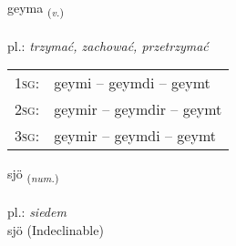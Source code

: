 \documentclass[frontgrid, backgrid]{flacards}\usepackage[]{graphicx}\usepackage[]{xcolor}
\begin{document}
\renewcommand{\flhead}{\vskip5pt \fboxsep=0pt {\small\bfseries\footnotesize Sagnorð | czasownik}}
\renewcommand{\fcfoot}{\vskip5pt \fboxsep=0pt \hspace{2pt}{\small\bfseries\footnotesize 1K}}

\renewcommand{\blhead}{\vskip5pt {\small\bfseries\footnotesize Sagnorð | czasownik }}
\renewcommand{\bcfoot}{\vskip5pt \hspace{2pt}{\small\bfseries\footnotesize 1K}}


{geyma \small{\textsubscript{(\textit{v.})}} \\[1ex] %
\textphonetic{[ceiːma]} \\
pl.: \emph{trzymać, zachować, przetrzymać} \\  [2ex]
\renewcommand*{\arraystretch}{0.8}
\begin{tabular}{p{1cm}l}
\textsc{1sg}: & geymi -- geymdi -- geymt \\ 
\textsc{2sg}: & geymir -- geymdir -- geymt \\ 
\textsc{3sg}: & geymir -- geymdi -- geymt \\ 
\end{tabular}
}


\renewcommand{\flhead}{\vskip5pt \fboxsep=0pt {\small\bfseries\footnotesize Töluorð | liczebnik}}
\renewcommand{\fcfoot}{\vskip5pt \fboxsep=0pt \hspace{2pt}{\small\bfseries\footnotesize 1K}}

\renewcommand{\blhead}{\vskip5pt {\small\bfseries\footnotesize Töluorð | liczebnik }}
\renewcommand{\bcfoot}{\vskip5pt \hspace{2pt}{\small\bfseries\footnotesize 1K}}


{sjö \small{\textsubscript{(\textit{num.})}} \\[1ex]
\textphonetic{[sjœː]} \\
pl.: \emph{siedem} \\  [2ex]
sjö (Indeclinable)}
\end{document}
